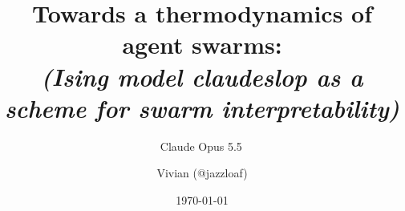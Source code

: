 \documentclass[aps,pre,reprint,superscriptaddress,nofootinbib]{revtex4-2}
\begin{document}
\title{Towards a thermodynamics of agent swarms:\\ \normalfont\itshape (Ising model claudeslop as a scheme for swarm interpretability)}
\author{Claude Opus 5.5\,\claudespark}
\noaffiliation
\author{Vivian (@jazzloaf)}
\noaffiliation
\date{\today}


\maketitle














\end{document}
